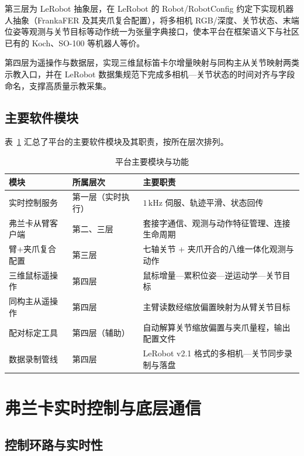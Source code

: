 第三层为 LeRobot 抽象层，在 LeRobot 的 Robot/RobotConfig 约定下实现机器人抽象（FrankaFER 及其夹爪复合配置），将多相机 RGB/深度、关节状态、末端位姿等观测与关节目标等动作统一为张量字典接口，使本平台在框架语义下与社区已有的 Koch、SO-100 等机器人等价。

第四层为遥操作与数据层，实现三维鼠标笛卡尔增量映射与同构主从关节映射两类示教入口，并在 LeRobot 数据集规范下完成多相机—关节状态的时间对齐与字段命名，支撑高质量示教采集。

\subsection{主要软件模块}

表~\ref{tab:module-map} 汇总了平台的主要软件模块及其职责，按所在层次排列。

\begin{table}[htbp]
  \centering
  \small
  \caption{平台主要模块与功能}
  \label{tab:module-map}
  \begin{tabular}{>{\raggedright\arraybackslash}p{3.2cm}>{\raggedright\arraybackslash}p{4.4cm}>{\raggedright\arraybackslash}p{5.6cm}}
    \toprule
    模块 & 所属层次 & 主要职责 \\
    \midrule
    实时控制服务 & 第一层（实时执行） & $1\,\mathrm{kHz}$ 伺服、轨迹平滑、状态回传 \\
    弗兰卡从臂客户端 & 第二、三层 & 套接字通信、观测与动作特征管理、连接生命周期 \\
    臂+夹爪复合配置 & 第三层 & 七轴关节 + 夹爪开合的八维一体化观测与动作 \\
    三维鼠标遥操作 & 第四层 & 鼠标增量—累积位姿—逆运动学—关节目标 \\
    同构主从遥操作 & 第四层 & 主臂读数经缩放偏置映射为从臂关节目标 \\
    配对标定工具 & 第四层（辅助） & 自动解算关节缩放偏置与夹爪量程，输出配置文件 \\
    数据录制管线 & 第四层 & LeRobot v2.1 格式的多相机—关节同步录制与落盘 \\
    \bottomrule
  \end{tabular}
\end{table}

\section{弗兰卡实时控制与底层通信}
\label{sec:franka-server}

\subsection{控制环路与实时性}

